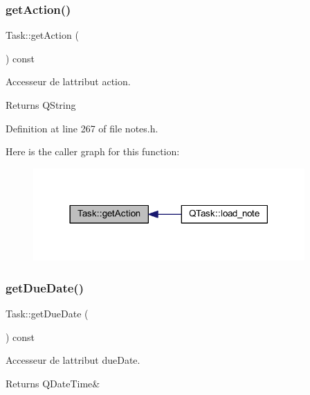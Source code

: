 \subsubsection{\texorpdfstring{get\+Action()}{getAction()}}
{\footnotesize\ttfamily Task\+::get\+Action (\begin{DoxyParamCaption}{ }\end{DoxyParamCaption}) const\hspace{0.3cm}{\ttfamily [inline]}}



Accesseur de l\textquotesingle{}attribut action. 

\begin{DoxyReturn}{Returns}
Q\+String 
\end{DoxyReturn}


Definition at line 267 of file notes.\+h.

Here is the caller graph for this function\+:\nopagebreak
\begin{figure}[H]
\begin{center}
\leavevmode
\includegraphics[width=294pt]{class_task_a3c99152a4a000b4b3ae8a50b2c450825_icgraph}
\end{center}
\end{figure}
\mbox{\label{class_task_abee7cd65af2bb2028dfaa3ec0d10bfe5}} 
\subsubsection{\texorpdfstring{get\+Due\+Date()}{getDueDate()}}
{\footnotesize\ttfamily Task\+::get\+Due\+Date (\begin{DoxyParamCaption}{ }\end{DoxyParamCaption}) const\hspace{0.3cm}{\ttfamily [inline]}}



Accesseur de l\textquotesingle{}attribut due\+Date. 

\begin{DoxyReturn}{Returns}
Q\+Date\+Time\& 
\end{DoxyReturn}


